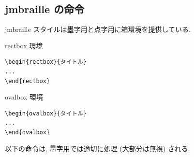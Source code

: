 \documentclass[lualatex,ja=standard,jafont=haranoaji]{bxjsarticle}
\begin{document}
\subsection{jmbraille の命令}
jmbraille スタイルは墨字用と点字用に箱環境を提供している. 

\begin{rectbox}{rectbox 環境}
\begin{verbatim}
\begin{rectbox}{タイトル}
...
\end{rectbox}
\end{verbatim}
\end{rectbox}
\begin{ovalbox}{ovalbox 環境}
\begin{verbatim}
\begin{ovalbox}{タイトル}
...
\end{ovalbox}  
\end{verbatim}
\end{ovalbox}

以下の命令は, 墨字用では適切に処理 (大部分は無視) される.
\end{document}
